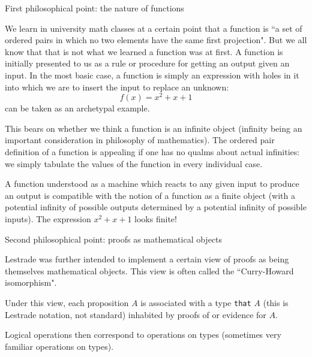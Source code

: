 \documentclass{slides}
\begin{document}
\begin{slide}

{\Large First philosophical point:  the nature of functions}

We learn in university math classes at a certain point that a function is ``a set of ordered pairs in which no two elements have the same first projection".  But we all know that that is not what we learned a function was at first.  A function is initially presented to us as a rule or procedure for getting an output given an input.  In the most basic case, a function is simply an expression with holes in it into which we are to insert the input to replace an unknown:  $$f(x) = x^2 + x +1$$ can be taken as an archetypal example.

\end{slide}

\begin{slide}

This bears on whether we think a function is an infinite object (infinity being an important consideration in philosophy of mathematics).  The ordered pair definition of a function
is appealing if one has no qualms about actual infinities:  we simply tabulate the values of the function in every individual case.

A function understood as a machine which reacts to any given input to produce an output is compatible with the notion of a function as a finite object (with a potential infinity of possible outputs determined by a potential infinity of possible inputs).  The expression $x^2+x+1$ looks finite!

\end{slide}

\begin{slide}

{\Large Second philosophical point:  proofs as mathematical objects}

Lestrade was further intended to implement a certain view of proofs as being themselves mathematical objects.  This view is often called the ``Curry-Howard isomorphism".

Under this view, each proposition $A$ is associated with a type {\tt that} $A$ (this is Lestrade notation, not standard) inhabited by proofs of or evidence for $A$.

Logical operations then correspond to operations on types (sometimes very familiar operations on types).


\end{slide}
\end{document}
